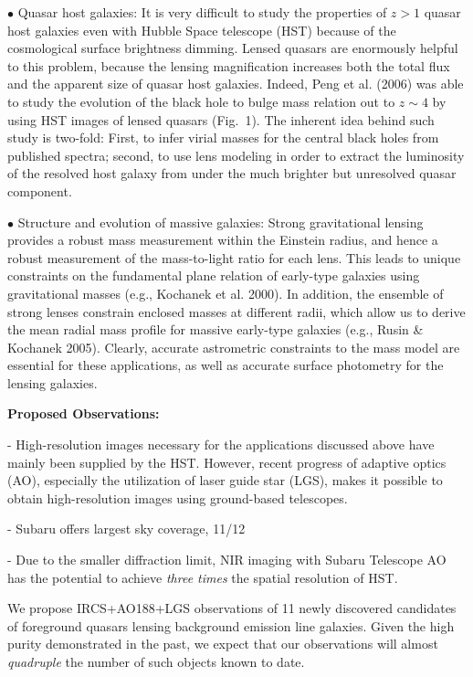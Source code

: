 \documentclass[a4paper,11pt]{article}
\begin{document}
$\bullet$ Quasar host galaxies: It is very difficult to study the
properties of $z>1$ quasar host galaxies even with Hubble Space
telescope (HST) because of the cosmological surface brightness
dimming. Lensed quasars are enormously helpful to this problem,
because the lensing magnification increases both the total flux and
the apparent size of quasar host galaxies. Indeed, Peng et al. (2006)
was able to study the evolution of the black hole to bulge mass
relation out to $z\sim 4$ by using HST images of lensed quasars
(Fig.~1). The inherent idea behind such study is two-fold: First,  to infer virial masses
 for the central black holes from published spectra; second, to use lens 
 modeling in order to extract the luminosity of the 
 resolved host galaxy from under the much brighter but unresolved quasar component.

\medskip

$\bullet$ Structure and evolution of massive galaxies: Strong
gravitational lensing provides a robust mass measurement within the
Einstein radius, and hence a robust measurement of the mass-to-light
ratio for each lens. This leads to unique constraints on the
fundamental plane relation of early-type galaxies using gravitational
masses (e.g., Kochanek et al. 2000). In addition, the ensemble of strong
lenses  constrain enclosed masses at different radii, which allow us to
derive the mean radial mass profile for massive early-type galaxies
(e.g., Rusin \& Kochanek 2005). Clearly, accurate astrometric
constraints to the mass model are essential for these applications, as
well as accurate surface photometry for the lensing galaxies.

{\bf Proposed Observations:} 

- High-resolution images necessary for the applications discussed above have mainly been supplied by the HST. However, recent progress of adaptive optics (AO), especially the utilization of laser guide star (LGS), makes it possible to obtain high-resolution images using ground-based telescopes. 

- Subaru offers largest sky coverage, 11/12

- Due to the smaller diffraction limit, NIR imaging with Subaru Telescope AO has the potential to achieve {\it three times} the spatial resolution of HST.

We propose IRCS+AO188+LGS observations of 11 newly discovered candidates of foreground quasars lensing background emission line galaxies. Given the high purity demonstrated in the past, we expect that our observations will almost {\it quadruple} the number of such objects known to date.   
\end{document}

